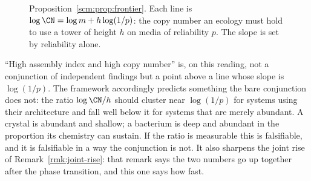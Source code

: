 \begin{figure}[t]
\centering
{}
\caption{Proposition~\ref{scm:prop:frontier}. Each line is
$\log \CN = \log m + h \log(1/p)$: the copy number an ecology must hold to
use a tower of height $h$ on media of reliability $p$. The slope is set by
reliability alone.}
\label{scm:fig:frontier}
\end{figure}

\begin{remark}
\label{scm:rmk:biosig}
``High assembly index and high copy number'' is, on this reading, not a
conjunction of independent findings but a point above a line whose slope
is $\log(1/p)$. The framework accordingly predicts something the bare
conjunction does not: the ratio $\log \CN / h$ should cluster near
$\log(1/p)$ for systems using their architecture and fall well below it
for systems that are merely abundant. A crystal is abundant and shallow; a
bacterium is deep and abundant in the proportion its chemistry can
sustain. If the ratio is measurable this is falsifiable, and it is
falsifiable in a way the conjunction is not. It also sharpens the joint
rise of Remark~\ref{rmk:joint-rise}: that remark says the two numbers go
up together after the phase transition, and this one says how fast.
\end{remark}

